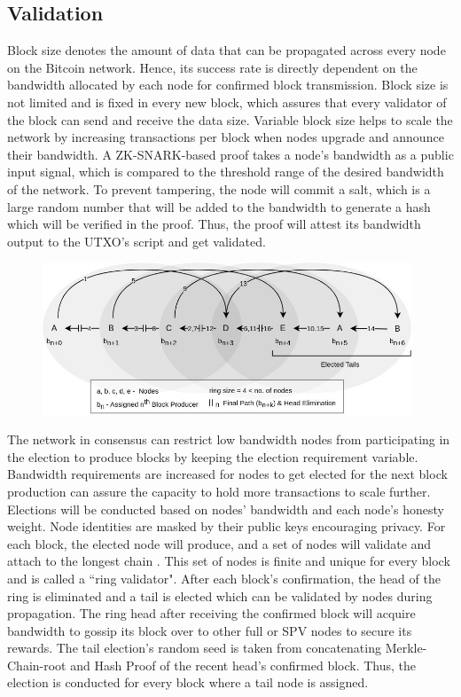 \documentclass[a4paper, 10pt]{extarticle}
\begin{document}
\subsection{Validation}
Block size denotes the amount of data that can be propagated across every node on the Bitcoin network. Hence, its success rate is directly dependent on the bandwidth allocated by each node for confirmed block transmission. Block size is not limited and is fixed in every new block, which assures that every validator of the block can send and receive the data size. Variable block size helps to scale the network by increasing transactions per block when nodes upgrade and announce their bandwidth. A ZK-SNARK-based proof takes a node’s bandwidth as a public input signal, which is compared to the threshold range of the desired bandwidth of the network. To prevent tampering, the node will commit a salt, which is a large random number that will be added to the bandwidth to generate a hash which will be verified in the proof. Thus, the proof will attest its bandwidth output to the UTXO’s script and get validated.
\begin{figure}[H]
\begin{center}
\includegraphics[width=11cm]{ring}
\end{center}
\end{figure}
The network in consensus can restrict low bandwidth nodes from participating in the election to produce blocks by keeping the election requirement variable. Bandwidth requirements are increased for nodes to get elected for the next block production can assure the capacity to hold more transactions to scale further. Elections will be conducted based on nodes' bandwidth and each node's honesty weight. Node identities are masked by their public keys encouraging privacy. For each block, the elected node will produce, and a set of nodes will validate and attach to the longest chain \cite{nakamoto2008bitcoin}. This set of nodes is finite and unique for every block and is called a ``ring validator". After each block's confirmation, the head of the ring is eliminated and a tail is elected which can be validated by nodes during propagation. The ring head after receiving the confirmed block will acquire bandwidth to gossip its block over to other full or SPV nodes to secure its rewards. The tail election's random seed is taken from concatenating Merkle-Chain-root and Hash Proof \cite{yakovenko2018solana} of the recent head's confirmed block. Thus, the election is conducted for every block where a tail node is assigned.
\end{document}
